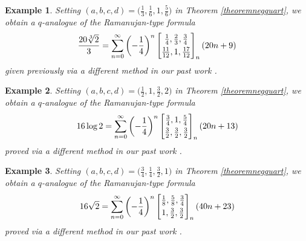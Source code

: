 \documentclass[12pt]{article}
\newtheorem{example}{Example}
\begin{document}
\begin{example}
 Setting $(a, b, c, d) = \big( \frac{1}{3}, \frac{1}{6}, 1, \frac{5}{6} \big)$ in Theorem \ref{theoremnegquart}, we obtain 
 a $q$-analogue of the Ramanujan-type formula 
\begin{equation*}
 \frac{20 \sqrt[3]{2} }{3} = 
 \sum_{n = 0}^{\infty} 
 \left( -\frac{1}{4} \right)^{n} \left[ \begin{matrix} 
 \frac{1}{4}, \frac{2}{3}, \frac{3}{4} 
 \vspace{1mm} \\ 
 \frac{11}{12}, 1, \frac{17}{12}
 \end{matrix} \right]_{n} (20 n + 9) 
 \end{equation*}
 given previously via a different method
 in our past work \cite{Campbellunpublished}. 
\end{example}

\begin{example}
 Setting $(a, b, c, d) = \big( \frac{1}{2}, 1, \frac{3}{2}, 2 \big)$ in Theorem \ref{theoremnegquart}, we obtain a $q$-analogue of the 
 Ramanujan-type formula 
\begin{equation}\label{20251q129411ee1e0e3eqAqMq1qA}
 16 \log 2 = 
 \sum_{n = 0}^{\infty} 
 \left( -\frac{1}{4} \right)^{n} \left[ \begin{matrix} 
 \frac{3}{4}, 1, \frac{5}{4} 
 \vspace{1mm} \\ 
 \frac{3}{2}, \frac{3}{2}, \frac{3}{2}
 \end{matrix} \right]_{n} (20 n + 13) 
 \end{equation}
 proved via a different method in our past work \cite{Campbellunpublished}. 
\end{example}

 \begin{example}
 Setting $(a, b, c, d) = \big( \frac{3}{4}, \frac{1}{4}, \frac{3}{2}, 1 \big)$ in Theorem \ref{theoremnegquart}, we obtain 
 a $q$-analogue of the Ramanujan-type formula 
\begin{equation*}
 16 \sqrt{2} = 
 \sum_{n = 0}^{\infty} 
 \left( -\frac{1}{4} \right)^{n} \left[ \begin{matrix} 
 \frac{1}{8}, \frac{5}{8}, \frac{3}{4} 
 \vspace{1mm} \\ 
 1, \frac{3}{2}, \frac{3}{2} 
 \end{matrix} \right]_{n} (40 n + 23) 
 \end{equation*}
 proved via a different method in our past work \cite{Campbellunpublished}. 
\end{example}
\end{document}
